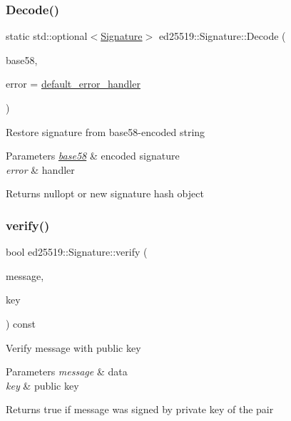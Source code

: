 \subsubsection{\texorpdfstring{Decode()}{Decode()}}
{\footnotesize\ttfamily static std\+::optional$<$\mbox{\hyperlink{classed25519_1_1_signature}{Signature}}$>$ ed25519\+::\+Signature\+::\+Decode (\begin{DoxyParamCaption}\item[{const std\+::string \&}]{base58,  }\item[{const \mbox{\hyperlink{namespaceed25519_a6ba572942b3c18591fc869d52a6b16e6}{Error\+Handler}} \&}]{error = {\ttfamily \mbox{\hyperlink{namespaceed25519_a7c7bb6ed17541162959c33ed3e3b15fb}{default\+\_\+error\+\_\+handler}}} }\end{DoxyParamCaption})\hspace{0.3cm}{\ttfamily [static]}}

Restore signature from base58-\/encoded string 
\begin{DoxyParams}{Parameters}
{\em \mbox{\hyperlink{namespaceed25519_1_1base58}{base58}}} & encoded signature \\
\hline
{\em error} & handler \\
\hline
\end{DoxyParams}
\begin{DoxyReturn}{Returns}
nullopt or new signature hash object 
\end{DoxyReturn}
\mbox{\label{classed25519_1_1_signature_aca2ff60a3e305730cd62e7005b92cfef}} 
\subsubsection{\texorpdfstring{verify()}{verify()}\hspace{0.1cm}{\footnotesize\ttfamily [1/3]}}
{\footnotesize\ttfamily bool ed25519\+::\+Signature\+::verify (\begin{DoxyParamCaption}\item[{const std\+::vector$<$ unsigned char $>$ \&}]{message,  }\item[{const \mbox{\hyperlink{classed25519_1_1keys_1_1_public}{keys\+::\+Public}} \&}]{key }\end{DoxyParamCaption}) const}

Verify message with public key 
\begin{DoxyParams}{Parameters}
{\em message} & data \\
\hline
{\em key} & public key \\
\hline
\end{DoxyParams}
\begin{DoxyReturn}{Returns}
true if message was signed by private key of the pair 
\end{DoxyReturn}
\mbox{\label{classed25519_1_1_signature_a365b186127ea5150dd233c9c89ac4faf}} 
